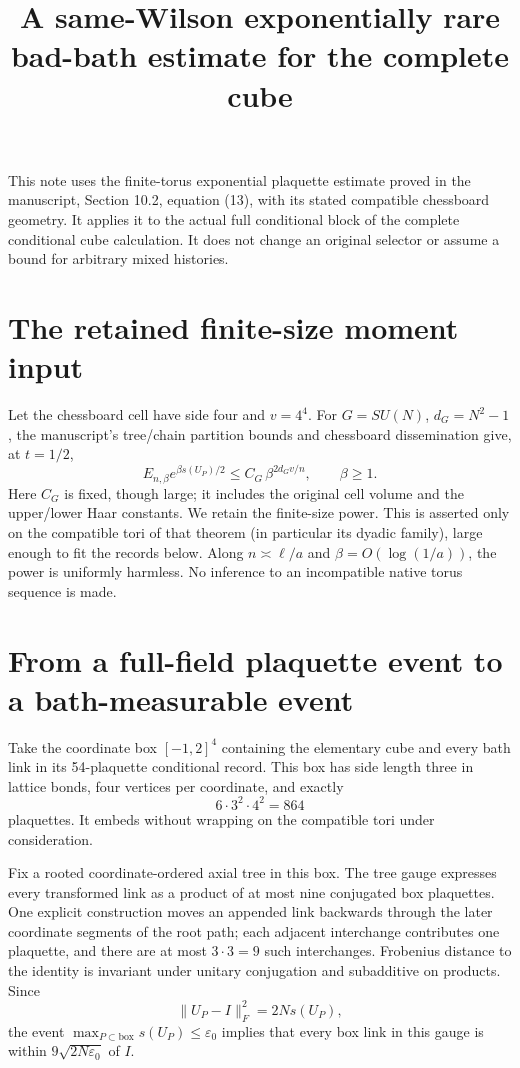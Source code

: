 \documentclass{article}
\title{A same-Wilson exponentially rare bad-bath estimate for the complete cube}\author{}\date{}
\begin{document}
\maketitle
This note uses the finite-torus exponential plaquette estimate proved in the manuscript, Section 10.2, equation (13), with its stated compatible chessboard geometry. It applies it to the actual full conditional block of the complete conditional cube calculation. It does not change an original selector or assume a bound for arbitrary mixed histories.

\section{The retained finite-size moment input}
Let the chessboard cell have side four and $v=4^4$. For $G=SU(N)$, $d_G=N^2-1$, the manuscript's tree/chain partition bounds and chessboard dissemination give, at $t=1/2$,
\[
 E_{n,\beta}e^{\beta s(U_P)/2}\leq
 C_G\,\beta^{2d_Gv/n},\qquad\beta\geq1.
 \tag{1}
\]
Here $C_G$ is fixed, though large; it includes the original cell volume and the upper/lower Haar constants. We retain the finite-size power. This is asserted only on the compatible tori of that theorem (in particular its dyadic family), large enough to fit the records below. Along $n\asymp\ell/a$ and $\beta=O(\log(1/a))$, the power is uniformly harmless. No inference to an incompatible native torus sequence is made.

\section{From a full-field plaquette event to a bath-measurable event}
Take the coordinate box $[-1,2]^4$ containing the elementary cube and every bath link in its 54-plaquette conditional record. This box has side length three in lattice bonds, four vertices per coordinate, and exactly
\[
 6\cdot3^2\cdot4^2=864
\]
plaquettes. It embeds without wrapping on the compatible tori under consideration.

Fix a rooted coordinate-ordered axial tree in this box. The tree gauge expresses every transformed link as a product of at most nine conjugated box plaquettes. One explicit construction moves an appended link backwards through the later coordinate segments of the root path; each adjacent interchange contributes one plaquette, and there are at most $3\cdot3=9$ such interchanges. Frobenius distance to the identity is invariant under unitary conjugation and subadditive on products. Since
\[
 \|U_P-I\|_F^2=2N s(U_P),
\]
the event $\max_{P\subset\text{box}}s(U_P)\leq\varepsilon_0$ implies that every box link in this gauge is within $9\sqrt{2N\varepsilon_0}$ of $I$.
\end{document}
